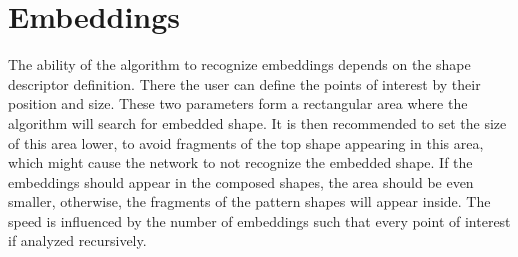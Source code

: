 \section{Embeddings}
The ability of the algorithm to recognize embeddings depends on the shape descriptor definition. There the user can define the points of interest by their position and size. These two parameters form a rectangular area where the algorithm will search for embedded shape. It is then recommended to set the size of this area lower, to avoid fragments of the top shape appearing in this area, which might cause the network to not recognize the embedded shape. If the embeddings should appear in the composed shapes, the area should be even smaller, otherwise, the fragments of the pattern shapes will appear inside. The speed is influenced by the number of embeddings such that every point of interest if analyzed recursively.

